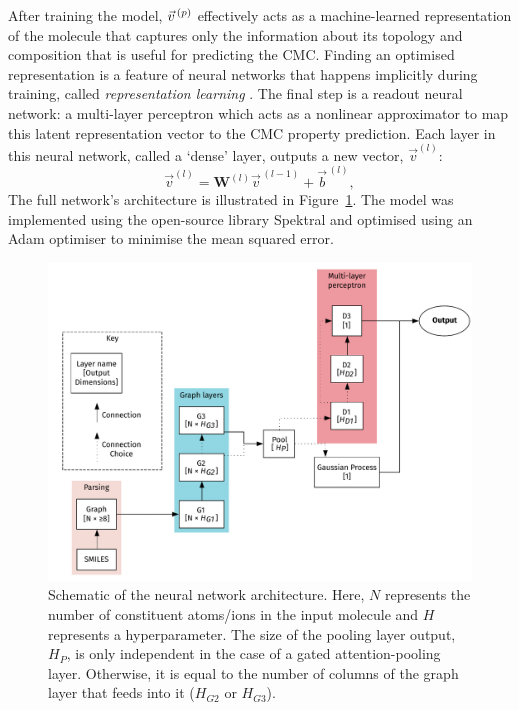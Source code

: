After training the model, $\vec{v}^{\,(p)}{}$ effectively acts as a machine-learned representation of the molecule that captures only the information about its topology and composition that is useful for predicting the CMC. Finding an optimised representation is a feature of neural networks that happens implicitly during training, called \emph{representation learning} \cite{goodfellowRepresentationLearning2016}.
The final step is a readout neural network: a multi-layer perceptron which acts as a nonlinear approximator to map this
latent representation vector to the CMC property prediction. Each layer in this neural network, called a `dense' layer, outputs a new vector, $\vec{v}^{(l)}$:
\begin{equation}
    \vec{v}^{(l)} = \mathbf{W}^{(l)}\vec{v}^{\,(l-1)} + \vec{b}^{\,(l)},
\end{equation}
The full network's architecture is illustrated in
Figure~\ref{fig:model-topology}. The model was implemented using the open-source
library Spektral\cite{grattarolaGraphNeuralNetworks2020} and optimised using an
Adam optimiser \cite{kingmaAdamMethodStochastic2017} to minimise the mean
squared error.

\begin{figure}
    \centering
    \includegraphics[width=\textwidth]{images/model_graph.pdf}
    \caption{Schematic of the neural network architecture. Here, $N$ represents
        the number of constituent atoms/ions in the input molecule and $H$
        represents a hyperparameter. The size of the pooling layer output, $H_P$, is
        only independent in the case of a gated attention-pooling layer. Otherwise,
        it is equal to the number of columns of the graph layer that feeds into it
        ($H_{G2}$ or $H_{G3}$).}
    \label{fig:model-topology}
\end{figure}

